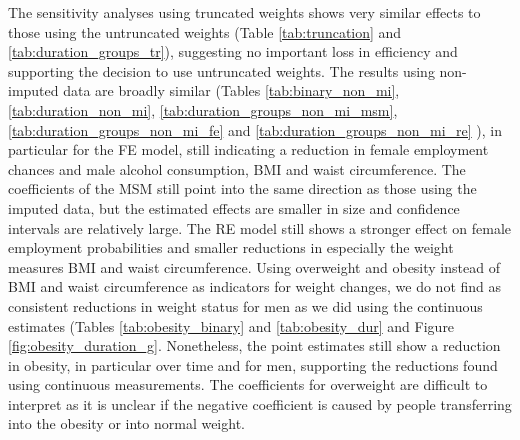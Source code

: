 The sensitivity analyses using truncated weights shows very similar effects to those using the untruncated weights (Table \ref{tab:truncation} and \ref{tab:duration_groups_tr}), suggesting no important loss in efficiency and supporting the decision to use untruncated weights. The results using non-imputed data are broadly similar (Tables \ref{tab:binary_non_mi}, \ref{tab:duration_non_mi}, \ref{tab:duration_groups_non_mi_msm}, \ref{tab:duration_groups_non_mi_fe} and \ref{tab:duration_groups_non_mi_re} ), in particular for the \ac{FE} model, still indicating a reduction in female employment chances and male alcohol consumption, \ac{BMI} and waist circumference. The coefficients of the \ac{MSM} still point into the same direction as those using the imputed data, but the estimated effects are smaller in size and confidence intervals are relatively large. The \ac{RE} model still shows a stronger effect on female employment probabilities and smaller reductions in especially the weight measures \ac{BMI} and waist circumference. Using overweight and obesity instead of \ac{BMI} and waist circumference as indicators for weight changes, we do not find as consistent reductions in weight status for men as we did using the continuous estimates (Tables \ref{tab:obesity_binary} and \ref{tab:obesity_dur} and Figure \ref{fig:obesity_duration_g}. Nonetheless, the point estimates still show a reduction in obesity, in particular over time and for men, supporting the reductions found using continuous measurements. The coefficients for overweight are difficult to interpret as it is unclear if the negative coefficient is caused by people transferring into the obesity or into normal weight.

